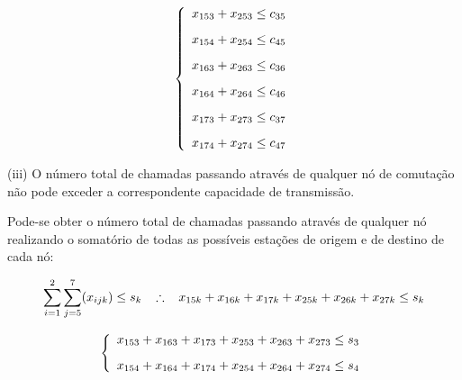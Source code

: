 \documentclass{article}
\begin{document}
        $$ \left\{
                \begin{array}{l}
                  x_{153} + x_{253} \leq c_{35}  \vspace{0.3cm} \\
                  
                  x_{154} + x_{254} \leq c_{45}  \vspace{0.3cm} \\
                  
                  x_{163} + x_{263} \leq c_{36}  \vspace{0.3cm} \\
                  
                  x_{164} + x_{264} \leq c_{46} \vspace{0.3cm}  \\
                  
                  x_{173} + x_{273} \leq c_{37} \vspace{0.3cm}  \\
                  
                  x_{174} + x_{274} \leq c_{47} 
                \end{array}
              \right. $$

(iii) O número total de chamadas passando através de
qualquer nó de comutação não pode exceder a correspondente capacidade de transmissão.

Pode-se obter o número total de chamadas passando através de
qualquer nó realizando o somatório de todas as possíveis estações de origem e de destino de cada nó:

\begin{equation*}
    \sum_{i=1}^{2}\sum_{j=5}^{7}(x_{ijk}) \leq s_{k} \hspace{0.3cm} 
    \therefore \hspace{0.3cm} x_{15k} + x_{16k} + x_{17k} + x_{25k} + x_{26k} + x_{27k} \leq s_{k}
\end{equation*}

        $$ \left\{
                \begin{array}{l}
                  x_{153} + x_{163} + x_{173} + x_{253} + x_{263} + x_{273} \leq s_{3}  \vspace{0.3cm} \\
                  
                  x_{154} + x_{164} + x_{174} + x_{254} + x_{264} + x_{274} \leq s_{4}
                \end{array}
              \right. $$
\end{document}
